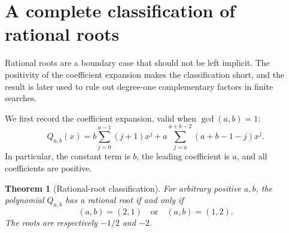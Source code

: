 \documentclass[11pt]{article}
\newtheorem{theorem}{Theorem}[section]
\theoremstyle{definition}
\begin{document}
\section{A complete classification of rational roots}
\label{sec:rational}

Rational roots are a boundary case that should not be left implicit.  The positivity of the coefficient expansion makes the classification short, and the result is later used to rule out degree-one complementary factors in finite searches.

We first record the coefficient expansion, valid when \(\gcd(a,b)=1\):
\begin{equation}
 Q_{a,b}(x)=
 b\sum_{j=0}^{a-1}(j+1)x^j
 +a\sum_{j=a}^{a+b-2}(a+b-1-j)x^j.
 \tag{10.1}
\end{equation}
In particular, the constant term is \(b\), the leading coefficient is \(a\),
and all coefficients are positive.

\begin{theorem}[Rational-root classification]\label{thm:rational}
For arbitrary positive \(a,b\), the polynomial \(Q_{a,b}\) has a rational root
if and only if
\[
 (a,b)=(2,1)\quad\text{or}\quad(a,b)=(1,2).
\]
The roots are respectively \(-1/2\) and \(-2\).
\end{theorem}
\end{document}
